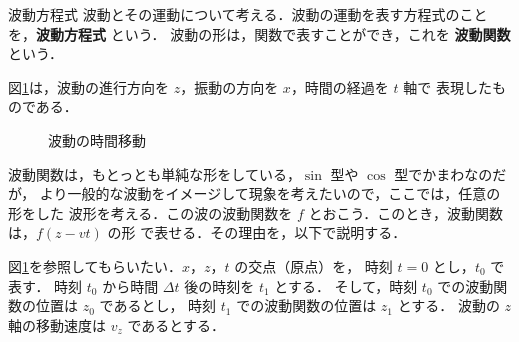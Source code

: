         \begin{memo}{波動方程式}
          波動とその運動について考える．波動の運動を表す方程式のことを，\textbf{波動方程式} という．
          波動の形は，関数で表すことができ，これを \textbf{波動関数} という．

          図\ref{fig:wave_eq001}は，波動の進行方向を $z$，振動の方向を $x$，時間の経過を $t$ 軸で
          表現したものである．
                        \begin{figure}[hbt]
                            \begin{center}
                                \caption{波動の時間移動}
                                \label{fig:wave_eq001}
                            \end{center}
                        \end{figure}


          波動関数は，もとっとも単純な形をしている，$\sin$ 型や $\cos$ 型でかまわなのだが，
          より一般的な波動をイメージして現象を考えたいので，ここでは，任意の形をした
          波形を考える．この波の波動関数を $f$ とおこう．このとき，波動関数は，$f(z-vt)$ の形
          で表せる．その理由を，以下で説明する．

          図\ref{fig:wave_eq001}を参照してもらいたい．$x$，$z$，$t$ の交点（原点）を，
          時刻 $t=0$ とし，$t_{0}$ で表す．
          時刻 $t_{0}$ から時間 $\Delta t$ 後の時刻を $t_{1}$ とする．
          そして，時刻 $t_{0}$ での波動関数の位置は $z_{0}$ であるとし，
          時刻 $t_{1}$ での波動関数の位置は $z_{1}$ とする．
          波動の $z$ 軸の移動速度は $v_{z}$ であるとする．


\end{memo}
